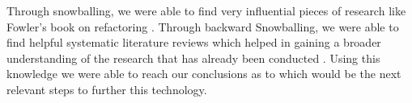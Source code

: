 Through snowballing, we were able to find very influential pieces of research like Fowler's book on refactoring \cite{fowler2018refactoring}.
Through backward Snowballing, we were able to find helpful systematic literature reviews which helped in gaining a broader understanding of the research that has already been conducted \cite{mariani2017systematic} \cite{baqais2020automatic} \cite{7833023}.
Using this knowledge we were able to reach our conclusions as to which would be the next relevant steps to further this technology.